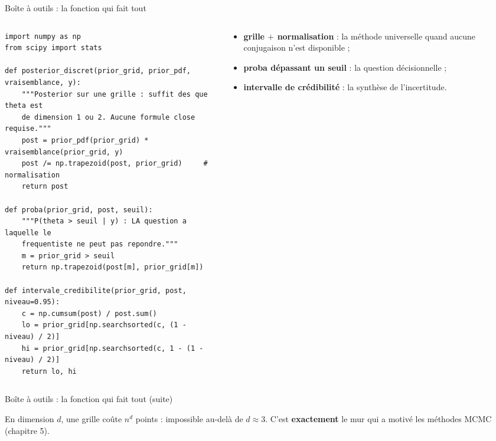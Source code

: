 \begin{frame}[fragile]{Boîte à outils : la fonction qui fait tout}
\small
\begin{columns}[t]
\begin{column}{0.53\textwidth}
\begin{codebox}
\begin{lstlisting}
import numpy as np
from scipy import stats

def posterior_discret(prior_grid, prior_pdf, vraisemblance, y):
    """Posterior sur une grille : suffit des que theta est
    de dimension 1 ou 2. Aucune formule close requise."""
    post = prior_pdf(prior_grid) * vraisemblance(prior_grid, y)
    post /= np.trapezoid(post, prior_grid)     # normalisation
    return post

def proba(prior_grid, post, seuil):
    """P(theta > seuil | y) : LA question a laquelle le
    frequentiste ne peut pas repondre."""
    m = prior_grid > seuil
    return np.trapezoid(post[m], prior_grid[m])

def intervale_credibilite(prior_grid, post, niveau=0.95):
    c = np.cumsum(post) / post.sum()
    lo = prior_grid[np.searchsorted(c, (1 - niveau) / 2)]
    hi = prior_grid[np.searchsorted(c, 1 - (1 - niveau) / 2)]
    return lo, hi
\end{lstlisting}
\end{codebox}
\end{column}
\begin{column}{0.45\textwidth}
\begin{kbox}
\begin{itemize}
  \item \textbf{grille $+$ normalisation} : la méthode universelle quand
        aucune conjugaison n'est disponible ;
  \item \textbf{proba dépassant un seuil} : la question décisionnelle ;
  \item \textbf{intervalle de crédibilité} : la synthèse de l'incertitude.
\end{itemize}
\end{kbox}
\end{column}
\end{columns}
\end{frame}

\begin{frame}{Boîte à outils : la fonction qui fait tout (suite)}
\begin{wbox}
En dimension $d$, une grille coûte $n^d$ points : impossible au-delà de
$d \approx 3$. C'est \textbf{exactement} le mur qui a motivé les méthodes MCMC
(chapitre 5).
\end{wbox}
\end{frame}

